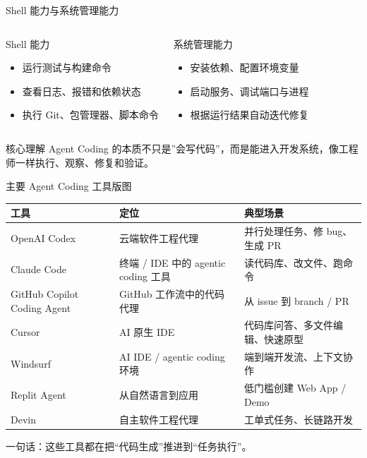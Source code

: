 \documentclass[aspectratio=169]{ctexbeamer}
\begin{document}
\begin{frame}{Shell 能力与系统管理能力}
\Large

\begin{columns}[T]
\begin{block}{Shell 能力}
\begin{itemize}
  \item 运行测试与构建命令
  \item 查看日志、报错和依赖状态
  \item 执行 Git、包管理器、脚本命令
\end{itemize}
\end{block}

\begin{block}{系统管理能力}
\begin{itemize}
  \item 安装依赖、配置环境变量
  \item 启动服务、调试端口与进程
  \item 根据运行结果自动迭代修复
\end{itemize}
\end{block}
\end{columns}

\vspace{0.3cm}

\begin{alertblock}{核心理解}
Agent Coding 的本质不只是”会写代码”，而是能进入开发系统，像工程师一样执行、观察、修复和验证。
\end{alertblock}
\end{frame}

\begin{frame}{主要 Agent Coding 工具版图}
\small

\begin{tabular}{p{} p{} p{}}
\toprule
\textbf{工具} & \textbf{定位} & \textbf{典型场景} \\
\midrule
OpenAI Codex & 云端软件工程代理 & 并行处理任务、修 bug、生成 PR \\
Claude Code & 终端 / IDE 中的 agentic coding 工具 & 读代码库、改文件、跑命令 \\
GitHub Copilot Coding Agent & GitHub 工作流中的代码代理 & 从 issue 到 branch / PR \\
Cursor & AI 原生 IDE & 代码库问答、多文件编辑、快速原型 \\
Windsurf & AI IDE / agentic coding 环境 & 端到端开发流、上下文协作 \\
Replit Agent & 从自然语言到应用 & 低门槛创建 Web App / Demo \\
Devin & 自主软件工程代理 & 工单式任务、长链路开发 \\
\bottomrule
\end{tabular}

\vspace{0.4cm}

\footnotesize
一句话：这些工具都在把“代码生成”推进到“任务执行”。
\end{frame}
\end{document}
